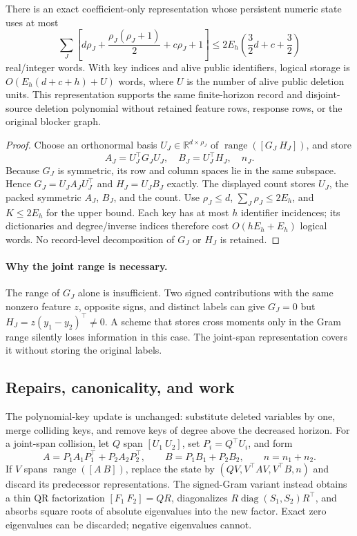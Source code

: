 \begin{theorem}
There is an exact coefficient-only representation whose persistent numeric
state uses at most
\[
 \sum_J\left[d\rho_J+\frac{\rho_J(\rho_J+1)}2+
                    c\rho_J+1\right]
 \le 2E_h\left(\frac32d+c+\frac32\right)
\]
real/integer words. With key indices and alive public identifiers, logical
storage is $O(E_h(d+c+h)+U)$ words, where $U$ is the number of alive public
deletion units. This representation supports the same finite-horizon record
and disjoint-source deletion polynomial without retained feature rows,
response rows, or the original blocker graph.
\end{theorem}
\begin{proof}
Choose an orthonormal basis $U_J\in\mathbb R^{d\times\rho_J}$ of
$\operatorname{range}([G_J\ H_J])$, and store
\[
 A_J=U_J^\top G_JU_J,\quad B_J=U_J^\top H_J,\quad n_J.
\]
Because $G_J$ is symmetric, its row and column spaces lie in the same
subspace. Hence $G_J=U_JA_JU_J^\top$ and $H_J=U_JB_J$ exactly. The displayed
count stores $U_J$, the packed symmetric $A_J$, $B_J$, and the count.
Use $\rho_J\le d$, $\sum_J\rho_J\le2E_h$, and $K\le2E_h$ for the upper
bound. Each key has at most $h$ identifier incidences; its dictionaries and
degree/inverse indices therefore cost $O(hE_h+E_h)$ logical words. No
record-level decomposition of $G_J$ or $H_J$ is retained.
\end{proof}

\paragraph{Why the joint range is necessary.}
The range of $G_J$ alone is insufficient. Two signed contributions with the
same nonzero feature $z$, opposite signs, and distinct labels can give
$G_J=0$ but $H_J=z(y_1-y_2)^\top\ne0$. A scheme that stores cross moments
only in the Gram range silently loses information in this case. The
joint-span representation covers it without storing the original labels.

\subsection{Repairs, canonicality, and work}
The polynomial-key update is unchanged: substitute deleted variables by one,
merge colliding keys, and remove keys of degree above the decreased horizon.
For a joint-span collision, let $Q$ span $[U_1\ U_2]$, set
$P_i=Q^\top U_i$, and form
\[
 A=P_1A_1P_1^\top+P_2A_2P_2^\top,\qquad
 B=P_1B_1+P_2B_2,\qquad n=n_1+n_2.
\]
If $V$ spans $\operatorname{range}([A\ B])$, replace the state by
$(QV,V^\top AV,V^\top B,n)$ and discard its predecessor representations.
The signed-Gram variant instead obtains a thin QR factorization
$[F_1\ F_2]=QR$, diagonalizes
$R\operatorname{diag}(S_1,S_2)R^\top$, and absorbs square roots of absolute
eigenvalues into the new factor. Exact zero eigenvalues can be discarded;
negative eigenvalues cannot.

